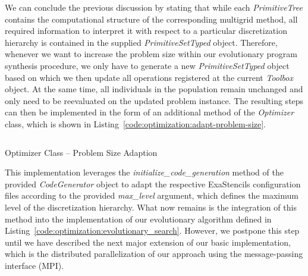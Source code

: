 We can conclude the previous discussion by stating that while each \emph{PrimitiveTree} contains the computational structure of the corresponding multigrid method, all required information to interpret it with respect to a particular discretization hierarchy is contained in the supplied \emph{PrimitiveSetTyped} object.
Therefore, whenever we want to increase the problem size within our evolutionary program synthesis procedure, we only have to generate a new \emph{PrimitiveSetTyped} object based on which we then update all operations registered at the current \emph{Toolbox} object.
At the same time, all individuals in the population remain unchanged and only need to be reevaluated on the updated problem instance.
The resulting steps can then be implemented in the form of an additional method of the \emph{Optimizer} class, which is shown in Listing~\ref{code:optimization:adapt-problem-size}.
\begin{listing}
	\inputminted{python}{evostencils/optimization/adapt_problem_size.py}
	\caption{Optimizer Class -- Problem Size Adaption}
	\label{code:optimization:adapt-problem-size}
\end{listing}
This implementation leverages the \emph{initialize\_code\_generation} method of the provided \emph{CodeGenerator} object to adapt the respective ExaStencils configuration files according to the provided \emph{max\_level} argument, which defines the maximum level of the discretization hierarchy.
What now remains is the integration of this method into the implementation of our evolutionary algorithm defined in Listing~\ref{code:optimization:evolutionary_search}.
However, we postpone this step until we have described the next major extension of our basic implementation, which is the distributed parallelization of our approach using the message-passing interface (MPI).


